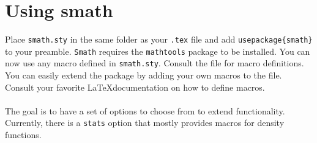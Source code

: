 \documentclass[a4paper,10pt]{scrartcl}
\begin{document}
\section{Using smath}
Place \texttt{smath.sty} in the same folder as your \texttt{.tex} file and add \texttt{usepackage\{smath\}} to your preamble. \texttt{Smath} requires the \texttt{mathtools} package to be installed. You can now use any macro defined in \texttt{smath.sty}. Consult the file for macro definitions. You can easily extend the package by adding your own macros to the file. Consult your favorite \LaTeX documentation on how to define macros.\\\\
The goal is to have a set of options to choose from to extend functionality. Currently, there is a \texttt{stats} option that mostly provides macros for density functions.
\end{document}
